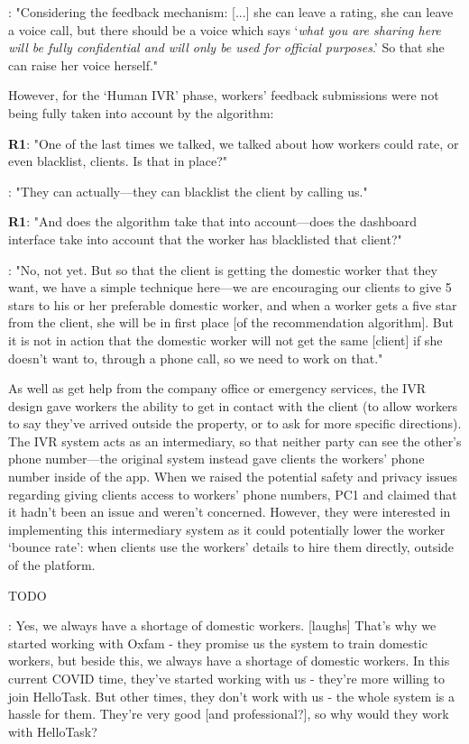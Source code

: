 \begin{displayquote}
\textbf{\NGOOne{}}: "Considering the feedback mechanism: [...] she can leave a rating, she can leave a voice call, but there should be a voice which says ‘\textit{what you are sharing here will be fully confidential and will only be used for official purposes}.’ So that she can raise her voice herself."
\end{displayquote}

However, for the `Human IVR' phase, workers' feedback submissions were not being fully taken into account by the algorithm:

\begin{displayquote}
\textbf{R1}: "One of the last times we talked, we talked about how workers could rate, or even blacklist, clients. Is that in place?"

\textbf{\PCTwo{}}: "They can actually---they can blacklist the client by calling us."

\textbf{R1}: "And does the algorithm take that into account---does the dashboard interface take into account that the worker has blacklisted that client?"

\textbf{\PCTwo{}}: "No, not yet. But so that the client is getting the domestic worker that they want, we have a simple technique here---we are encouraging our clients to give 5 stars to his or her preferable domestic worker, and when a worker gets a five star from the client, she will be in first place [of the recommendation algorithm]. But it is not in action that the domestic worker will not get the same [client] if she doesn't want to, through a phone call, so we need to work on that."
\end{displayquote}

As well as get help from the company office or emergency services, the IVR design gave workers the ability to get in contact with the client (to allow workers to say they've arrived outside the property, or to ask for more specific directions). The IVR system acts as an intermediary, so that neither party can see the other's phone number---the original system instead gave clients the workers' phone number inside of the app. When we raised the potential safety and privacy issues regarding giving clients access to workers' phone numbers, PC1 and \PCOne{} claimed that it hadn't been an issue and weren't concerned. However, they were interested in implementing this intermediary system as it could potentially lower the worker `bounce rate': when clients use the workers' details to hire them directly, outside of the \PC{} platform.


TODO

\begin{displayquote}
\textbf{\PCOne{}}: Yes, we always have a shortage of domestic workers. [laughs] That’s why we started working with Oxfam - they promise us the system to train domestic workers, but beside this, we always have a shortage of domestic workers. In this current COVID time, they’ve started working with us - they’re more willing to join HelloTask. But other times, they don’t work with us - the whole system is a hassle for them. They’re very good [and professional?], so why would they work with HelloTask?
\end{displayquote}
